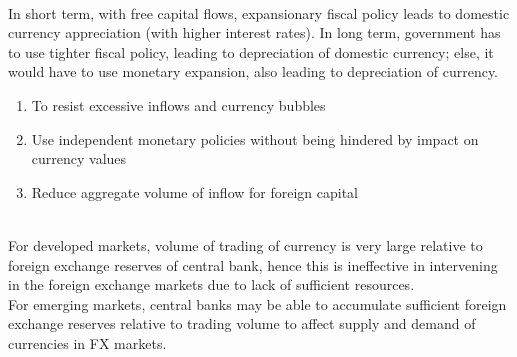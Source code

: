 \begin{remark} \\
In short term, with free capital flows, expansionary fiscal policy leads to domestic currency appreciation (with higher interest rates). In long term, government has to use tighter fiscal policy, leading to depreciation of domestic currency; else, it would have to use monetary expansion, also leading to depreciation of currency.
\end{remark}

\begin{remark} 
\begin{enumerate}[label=\roman*.]
\setlength{\itemsep}{0pt}
\item To resist excessive inflows and currency bubbles
\item Use independent monetary policies without being hindered by impact on currency values
\item Reduce aggregate volume of inflow for foreign capital
\end{enumerate}
\end{remark}

\begin{remark} \\
For developed markets, volume of trading of currency is very large relative to foreign exchange reserves of central bank, hence this is ineffective in intervening in the foreign exchange markets due to lack of sufficient resources.\\
For emerging markets, central banks may be able to accumulate sufficient foreign exchange reserves relative to trading volume to affect supply and demand of currencies in FX markets.
\end{remark}

